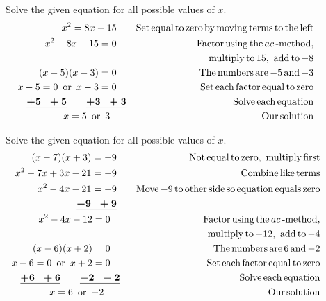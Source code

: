\begin{example}~~~Solve the given equation for all possible values of $x$.
  \begin{eqnarray*}
    x^2 = 8 x - 15~~~ &  & \operatorname{Set} \operatorname{equal} \operatorname{to} \operatorname{zero}
    \operatorname{by} \operatorname{moving} \operatorname{terms} \operatorname{to} \operatorname{the} \operatorname{left}\\
    x^2 - 8 x + 15 = 0~~~ &  & \operatorname{Factor} \operatorname{using} \operatorname{the} ac
    \operatorname{-method},\\
		&&\operatorname{~~~multiply} \operatorname{to} 15, \operatorname{~add} \operatorname{to} - 8\\
    (x - 5) (x - 3) = 0~~~ &  & \operatorname{The} \operatorname{numbers} \operatorname{are} - 5
    \operatorname{and} - 3\\
    x - 5 = 0 \operatorname{~or~} x - 3 = 0~~~ &  & \operatorname{Set} \operatorname{each} \operatorname{factor}
    \operatorname{equal} \operatorname{to} \operatorname{zero}\\
    \boldsymbol{\underline{+ 5 ~~+ 5} ~~~~~~ \underline{+ 3 ~~+ 3}} &  & \operatorname{Solve} \operatorname{each}
    \operatorname{equation}\\
    x = 5 \operatorname{~or~} 3~~~~~ &  & \operatorname{Our} \operatorname{solution}
  \end{eqnarray*}
\end{example}

\begin{example}~~~Solve the given equation for all possible values of $x$.
  \begin{eqnarray*}
    (x - 7) (x + 3) = - 9~~~ &  & \operatorname{Not} \operatorname{equal} \operatorname{to} \operatorname{zero},
    \operatorname{~multiply} \operatorname{first}\\
    x^2 - 7 x + 3 x - 21 = - 9~~~ &  & \operatorname{Combine} \operatorname{like} \operatorname{terms}\\
    x^2 - 4 x - 21 = - 9~~~ &  & \operatorname{Move} - 9 \operatorname{to} \operatorname{other}
    \operatorname{side} \operatorname{so} \operatorname{equation} \operatorname{equals} \operatorname{zero}\\
    \boldsymbol{\underline{+ 9 ~~+ 9}}~~~ &  & \\
    x^2 - 4 x - 12 = 0~~~~~ &  & \operatorname{Factor} \operatorname{using} \operatorname{the} ac
    \operatorname{-method},\\
		&&\operatorname{~~~multiply} \operatorname{to} - 12, \operatorname{~add} \operatorname{to} - 4\\
    (x - 6) (x + 2) = 0~~~~~ &  & \operatorname{The} \operatorname{numbers} \operatorname{are} 6 \operatorname{and}
    - 2\\
    x - 6 = 0 \operatorname{~or~} x + 2 = 0~~~~~ &  & \operatorname{Set} \operatorname{each} \operatorname{factor}
    \operatorname{equal} \operatorname{to} \operatorname{zero}\\
    \boldsymbol{\underline{+ 6 ~~+ 6} ~~~~~~ \underline{- 2 ~~- 2}}~~ &  & \operatorname{Solve} \operatorname{each}
    \operatorname{equation}\\
    x = 6 \operatorname{~or~} - 2~~~~~~~ &  & \operatorname{Our} \operatorname{solution}
  \end{eqnarray*}
\end{example}

